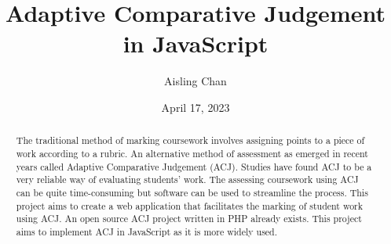 \documentclass{l4proj}
\begin{document}
\title{Adaptive Comparative Judgement in JavaScript}
\author{Aisling Chan}
\date{April 17, 2023}

\maketitle

\begin{abstract}

    The traditional method of marking coursework involves assigning points to a piece of work according to a rubric. An alternative method of assessment as emerged in recent years called Adaptive Comparative Judgement (ACJ). Studies have found ACJ to be a very reliable way of evaluating students' work. The assessing coursework using ACJ can be quite time-consuming but software can be used to streamline the process. This project aims to create a web application that facilitates the marking of student work using ACJ. An open source ACJ project written in PHP already exists. This project aims to implement ACJ in JavaScript as it is more widely used.
    
\end{abstract}


%
%
%
\educationalconsent


\tableofcontents
\end{document}
